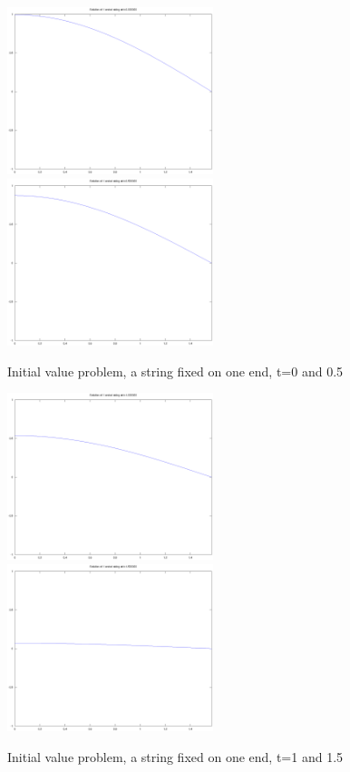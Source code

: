 \documentclass[a4paper,10pt]{report}
\begin{document}
\begin{figure}
 \includegraphics[width=6cm]{./one_fixed_end_analytic_t0.000000.eps}
\includegraphics[width=6cm]{./one_fixed_end_analytic_t0.500000.eps}

\caption{Initial value problem, a string fixed on one end, t=0 and 0.5}
\label{fig:half_bounded_1}
\end{figure} 

\begin{figure}
 \includegraphics[width=6cm]{./one_fixed_end_analytic_t1.000000.eps}
\includegraphics[width=6cm]{./one_fixed_end_analytic_t1.500000.eps}

\caption{Initial value problem, a string fixed on one end, t=1 and 1.5}

\end{figure} 
\end{document}
